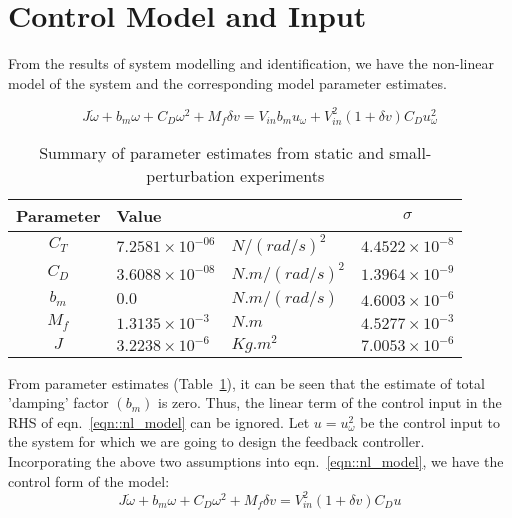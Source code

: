 \section{Control Model and Input}
From the results of system modelling and identification, we have the non-linear
model of the system and the corresponding model parameter estimates.

\begin{equation}\label{eqn::nl_model}
    J \dot \omega + b_m \omega + C_D \omega^2 + M_f \delta v = V_{in} b_m u_\omega + V_{in}^2 (1 + \delta v) C_D u_\omega^2
\end{equation}


\begin{table}[H]
    \centering
    \begin{tabular}{c l l c}
        \hline \hline
        Parameter & Value & & $\sigma$            \\ \hline \hline
        $C_T$ & $7.2581 \times 10^{-06}$ & $N/(rad/s)^2$   & $4.4522 \times 10^{-8}$ \\
        $C_D$ & $3.6088 \times 10^{-08}$ & $N.m/(rad/s)^2$ & $1.3964 \times 10^{-9}$ \\
        $b_m$ & $0.0$                    & $N.m/(rad/s)$   & $4.6003 \times 10^{-6}$  \\
        $M_f$ & $1.3135 \times 10^{-3}$  & $N.m$           & $4.5277 \times 10^{-3}$ \\
        $J$   & $3.2238 \times 10^{-6}$   & $Kg.m^2$        & $7.0053 \times 10^{-6}$ \\
        \hline \hline
    \end{tabular}
    \caption{Summary of parameter estimates from static and small-perturbation experiments}
    \label{tab::parm_ests}
\end{table}

From parameter estimates (Table~\ref{tab::parm_ests}), it can be seen that the
estimate of total 'damping' factor $( b_m )$ is zero. Thus, the linear term of
the control input in the RHS of eqn.~\ref{eqn::nl_model} can be ignored.
Let $u = u_\omega ^2 $ be the control input to the system for which we are going
to design the feedback controller. Incorporating the above two assumptions into
eqn.~\ref{eqn::nl_model}, we have the control form of the model:
\begin{equation} \label{eqn::control_form}
    J \dot \omega + b_m \omega + C_D \omega^2 + M_f \delta v = V_{in}^2 (1 + \delta v) C_D u
\end{equation}

